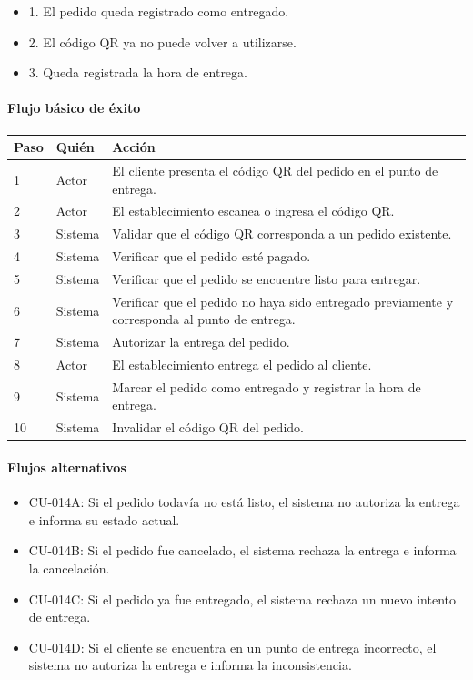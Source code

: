 \begin{description}[leftmargin=!, labelwidth=3.4cm, style=nextline, topsep=3pt]
\item[Post-condiciones] \hfill
\begin{itemize}[leftmargin=1.2em, topsep=1pt]
  \item 1. El pedido queda registrado como entregado.
  \item 2. El código QR ya no puede volver a utilizarse.
  \item 3. Queda registrada la hora de entrega.
\end{itemize}

\end{description}

\paragraph{Flujo básico de éxito}
\begin{longtable}{P{1.1cm}P{1.8cm}P{10.5cm}}
\toprule
\textbf{Paso} & \textbf{Quién} & \textbf{Acción}\\
\midrule
{} & Actor & El cliente presenta el código QR del pedido en el punto de entrega.\\
2 & Actor & El establecimiento escanea o ingresa el código QR.\\
3 & Sistema & Validar que el código QR corresponda a un pedido existente.\\
4 & Sistema & Verificar que el pedido esté pagado.\\
5 & Sistema & Verificar que el pedido se encuentre listo para entregar.\\
6 & Sistema & Verificar que el pedido no haya sido entregado previamente y corresponda al punto de entrega.\\
7 & Sistema & Autorizar la entrega del pedido.\\
8 & Actor & El establecimiento entrega el pedido al cliente.\\
9 & Sistema & Marcar el pedido como entregado y registrar la hora de entrega.\\
10 & Sistema & Invalidar el código QR del pedido.\\
\bottomrule
\end{longtable}

\paragraph{Flujos alternativos}
\begin{itemize}[leftmargin=1.4em, topsep=1pt]
  \item CU-014A: Si el pedido todavía no está listo, el sistema no autoriza la entrega e informa su estado actual.
  \item CU-014B: Si el pedido fue cancelado, el sistema rechaza la entrega e informa la cancelación.
  \item CU-014C: Si el pedido ya fue entregado, el sistema rechaza un nuevo intento de entrega.
  \item CU-014D: Si el cliente se encuentra en un punto de entrega incorrecto, el sistema no autoriza la entrega e informa la inconsistencia.
\end{itemize}

